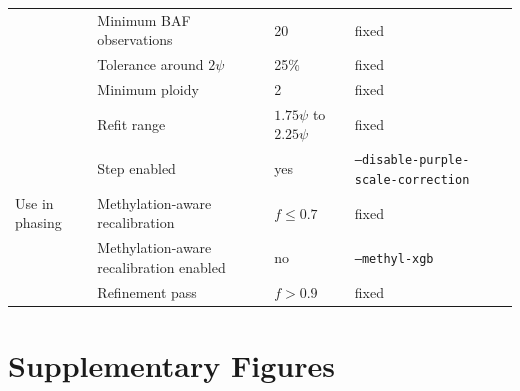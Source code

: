 \documentclass[pdflatex,sn-nature]{sn-jnl}
\def\pandocbounded#1{%
  \begingroup
  \setkeys{Gin}{width=1.0\linewidth,height=1.0\textheight,keepaspectratio}%
  #1%
  \endgroup
}
\begin{document}
\begin{table}[htbp]
\begin{tabular}{@{}p{2.6cm}p{4.4cm}p{2.0cm}l@{}}
     & Minimum BAF observations & 20 & fixed \\
     & Tolerance around $2\psi$ & 25\% & fixed \\
     & Minimum ploidy & 2 & fixed \\
     & Refit range & $1.75\psi$ to $2.25\psi$ & fixed \\
     & Step enabled & yes & \texttt{--disable-purple-scale-correction} \\
    Use in phasing & Methylation-aware recalibration & $f \le 0.7$ & fixed \\
     & Methylation-aware recalibration enabled & no & \texttt{--methyl-xgb} \\
     & Refinement pass & $f > 0.9$ & fixed \\
    \bottomrule
  \end{tabular}
\end{table}

\clearpage
\section{Supplementary Figures}
\FloatBarrier


\end{document}
